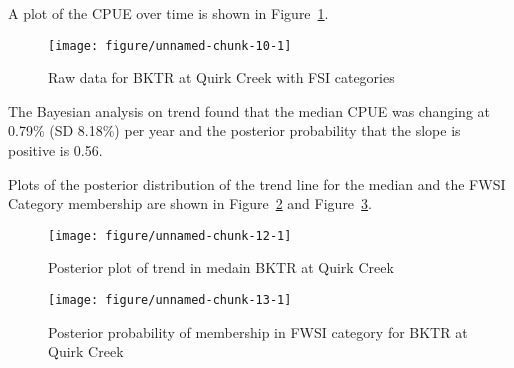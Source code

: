 \documentclass[]{article}\usepackage[]{graphicx}\usepackage[]{color}
\makeatletter
\def\maxwidth{ %
  \ifdim\Gin@nat@width>\linewidth
    \linewidth
  \else
    \Gin@nat@width
  \fi
}
\newenvironment{knitrout}{}{} %
\makeatother
\begin{document}
A plot of the CPUE over time is shown in Figure~\ref{fig:rawtrendBKTR}.

\begin{figure}[h]
\begin{center}
\begin{knitrout}
\color{fgcolor}
\texttt{[image: figure/unnamed-chunk-10-1]} 

\end{knitrout}
\end{center}
\caption{Raw data for BKTR at Quirk Creek with FSI categories}
\label{fig:rawtrendBKTR}
\end{figure}




The Bayesian analysis on trend found that the median CPUE was changing at 
 0.79\% (SD  8.18\%) per year
and the posterior probability that the slope is positive is  0.56.

Plots of the posterior distribution of the trend line for the median and the FWSI Category membership are shown in 
Figure~\ref{fig:postplotBKTR} and
Figure~\ref{fig:fsiplotBKTR}.

\begin{figure}[h]
\begin{center}
\begin{knitrout}
\color{fgcolor}
\texttt{[image: figure/unnamed-chunk-12-1]} 

\end{knitrout}
\end{center}
\caption{Posterior plot of trend in medain BKTR at Quirk Creek}
\label{fig:postplotBKTR}
\end{figure}

\begin{figure}[h]
\begin{center}
\begin{knitrout}
\color{fgcolor}
\texttt{[image: figure/unnamed-chunk-13-1]} 

\end{knitrout}
\end{center}
\caption{Posterior probability of membership in FWSI category for  BKTR at Quirk Creek}
\label{fig:fsiplotBKTR}
\end{figure}





\end{document}
